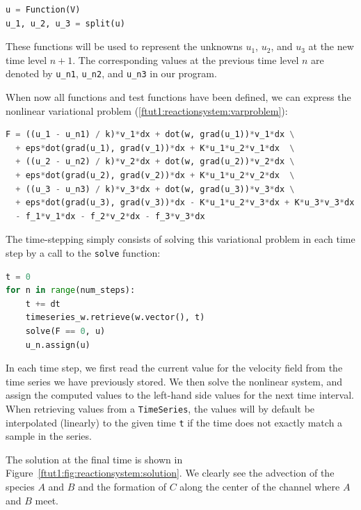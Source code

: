 \documentclass[graybox,envcountchap,sectrefs,final]{svmonodo}
\begin{document}
\begin{lstlisting}[language=Python,style=graycolor]
u = Function(V)
u_1, u_2, u_3 = split(u)
\end{lstlisting}
These functions will be used to represent the unknowns $u_1$, $u_2$, and $u_3$
at the new time level $n+1$. The corresponding values at the previous
time level $n$ are denoted by \Verb!u_n1!, \Verb!u_n2!, and \Verb!u_n3! in our program.

When now all functions and test functions have been defined, we can
express the nonlinear variational problem
(\ref{ftut1:reactionsystem:varproblem}):

\begin{lstlisting}[language=Python,style=graycolor]
F = ((u_1 - u_n1) / k)*v_1*dx + dot(w, grad(u_1))*v_1*dx \
  + eps*dot(grad(u_1), grad(v_1))*dx + K*u_1*u_2*v_1*dx  \
  + ((u_2 - u_n2) / k)*v_2*dx + dot(w, grad(u_2))*v_2*dx \
  + eps*dot(grad(u_2), grad(v_2))*dx + K*u_1*u_2*v_2*dx  \
  + ((u_3 - u_n3) / k)*v_3*dx + dot(w, grad(u_3))*v_3*dx \
  + eps*dot(grad(u_3), grad(v_3))*dx - K*u_1*u_2*v_3*dx + K*u_3*v_3*dx \
  - f_1*v_1*dx - f_2*v_2*dx - f_3*v_3*dx
\end{lstlisting}

The time-stepping simply consists of solving this variational problem
in each time step by a call to the \texttt{solve} function:

\begin{lstlisting}[language=Python,style=graycolor]
t = 0
for n in range(num_steps):
    t += dt
    timeseries_w.retrieve(w.vector(), t)
    solve(F == 0, u)
    u_n.assign(u)
\end{lstlisting}
In each time step, we first read the current value for the velocity
field from the time series we have previously stored. We then solve
the nonlinear system, and assign the computed values to the left-hand
side values for the next time interval. When retrieving values from a
\texttt{TimeSeries}, the values will by default be interpolated (linearly) to
the given time \texttt{t} if the time does not exactly match a sample in the
series.

The solution at the final time is shown in Figure~\ref{ftut1:fig:reactionsystem:solution}. We
clearly see the advection of the species $A$ and $B$ and the formation
of $C$ along the center of the channel where $A$ and $B$ meet.
\end{document}

